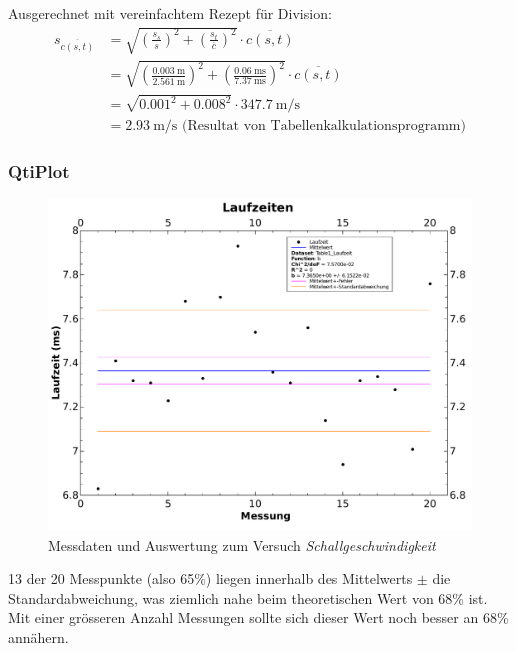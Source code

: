 Ausgerechnet mit vereinfachtem Rezept f\"ur Division:
\begin{align*}
    s_{\overline{c(s,t)}} & = \sqrt{ \left( \frac{s_{s}}{s} \right)^2 + \left( \frac{s_{t}}{\overline{c}} \right)^2} \cdot \overline{c(s,t)} \\
                          & = \sqrt{ \left( \frac{\SI{0.003}{\meter}}{\SI{2.561}{\meter}} \right)^2 + \left( \frac{\SI{0.06}{\milli\second}}{\SI{7.37}{\milli\second}} \right)^2 } \cdot \overline{c(s,t)} \\
                          & = \sqrt{ 0.001^2 + 0.008^2} \cdot \SI{347.7}{\meter\per\second} \\
                          & = \SI{2.93}{\meter\per\second} \text{ (Resultat von Tabellenkalkulationsprogramm)}
\end{align*}


\clearpage
\subsubsection{QtiPlot}
\begin{figure}[th!]
    \centering
    \includegraphics[width=\textwidth]{images/aufgabe1.pdf}
    \caption{Messdaten und Auswertung zum Versuch \emph{Schallgeschwindigkeit}}
    \label{fig:schallgeschwindigkeit}
\end{figure}

13 der  20 Messpunkte (also 65\%)  liegen innerhalb des Mittelwerts  $\pm$ die
Standardabweichung,  was  ziemlich  nahe  beim  theoretischen  Wert  von  68\%
ist. Mit  einer gr\"osseren  Anzahl  Messungen sollte  sich  dieser Wert  noch
besser an 68\% ann\"ahern.

